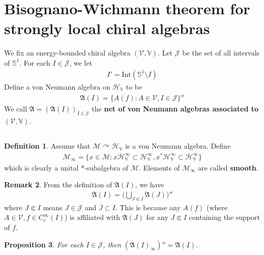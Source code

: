 \documentclass[12pt,b5paper,notitlepage]{article}
\theoremstyle{definition}
\newtheorem{df}{Definition}[section]
\newtheorem{rem}[df]{Remark}
\theoremstyle{plain}
\newtheorem{pp}[df]{Proposition}
\newcommand{\fk}{\mathfrak}
\newcommand{\mc}{\mathcal}
\newcommand{\ovl}{\overline}
\newcommand{\Vbb}{\mathbb V}
\newcommand{\Sbb}{{\mathbb S}}
\newcommand{\Int}{\mathrm{Int}}
\newcommand{\HV}{\mathcal H_{\mathbb V}}
\numberwithin{equation}{section}
\begin{document}
\newpage



\section{Bisognano-Wichmann theorem for strongly local chiral algebras}




We fix an energy-bounded chiral algebra $(\mc V,\Vbb)$. Let $\mc J$ be the set of all intervals of $\Sbb^1$. For each $I\in\mc J$, we let\index{I@$I'=\Int(\Sbb^1\setminus I)$}
\begin{align*}
I'=\Int(\Sbb^1\setminus I)
\end{align*}
Define a von Neumann algebra on $\HV$ to be
\begin{align*}
\fk A(I)=\{\ovl{A(f)}:A\in\mc V,I\in\mc J\}''
\end{align*}
We call $\fk A=(\fk A(I))_{I\in\mc J}$ the \textbf{net of von Neumann algebras associated to $(\mc V,\Vbb)$}.






\subsection{}


\begin{df}
Assume that $\mc M\curvearrowright\HV$ is a von Neumann algebra. Define
\begin{align*}
\mc M_\infty=\{x\in\mc M:x\HV^\infty\subset\HV^\infty,x^*\HV^\infty\subset\HV^\infty\}
\end{align*}
which is clearly a unital $*$-subalgebra of $\mc M$. Elements of $\mc M_\infty$ are called \textbf{smooth}.
\end{df}


\begin{rem}\label{lb96}
From the definition of $\fk A(I)$, we have
\begin{align*}
\fk A(I)=\bigg(\bigcup_{J\Subset I}\fk A(J)\bigg)''
\end{align*}
where $J\Subset I$ means $J\in\mc J$ and $\ovl J\subset I$. This is because any $A(f)$ (where $A\in\mc V,f\in C_c^\infty(I)$) is affiliated with $\fk A(J)$ for any $J\Subset I$ containing the support of $f$.
\end{rem}


\begin{pp}\label{lb97}
For each $I\in\mc J$, then $(\fk A(I)_\infty)''=\fk A(I)$.
\end{pp}
\end{document}
